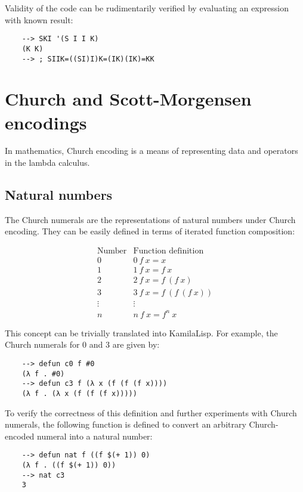 Validity of the code can be rudimentarily verified by evaluating an expression with known result:

\begin{Verbatim}
    --> SKI '(S I I K)
    (K K)
    --> ; SIIK=((SI)I)K=(IK)(IK)=KK
\end{Verbatim}

\section{Church and Scott-Morgensen encodings}

In mathematics, Church encoding is a means of representing data and operators in the lambda calculus.

\subsection{Natural numbers}

The Church numerals are the representations of natural numbers under Church encoding. They can be easily defined in terms of iterated function composition:

$$
\begin{array}{r|l}
    {\text{Number}}&{\text{Function definition}}\\
    \hline
    0&0\ f\ x=x\\
    1&1\ f\ x=f\ x\\
    2&2\ f\ x=f\ (f\ x)\\
    3&3\ f\ x=f\ (f\ (f\ x))\\
    \vdots&\vdots \\
    n&n\ f\ x=f^{n}\ x
\end{array}
$$

This concept can be trivially translated into KamilaLisp. For example, the Church numerals for 0 and 3 are given by:

\begin{Verbatim}
    --> defun c0 f #0
    (λ f . #0)
    --> defun c3 f (λ x (f (f (f x))))
    (λ f . (λ x (f (f (f x)))))
\end{Verbatim}

To verify the correctness of this definition and further experiments with Church numerals, the following function is defined to convert an arbitrary Church-encoded numeral into a natural number:

\begin{Verbatim}
    --> defun nat f ((f $(+ 1)) 0)
    (λ f . ((f $(+ 1)) 0))
    --> nat c3
    3
\end{Verbatim}

